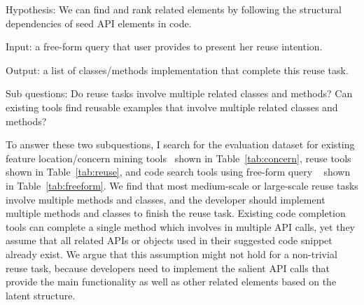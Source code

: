 Hypothesis: We can find and rank related elements by following the structural dependencies of seed API elements in code. 

Input: a free-form query that user provides to present her reuse intention.

Output: a list of classes/methods implementation that complete this reuse task.

Sub questions: Do reuse tasks involve multiple related classes and methods? Can existing tools find reusable examples that involve multiple related classes and methods?



To answer these two subquestions, I search for the evaluation dataset for existing feature location/concern mining tools~\cite{Denys:FCA12, Hill:FindConcept07, Hassan:concernHistory10, Breu:DynamicAspect04} shown in Table~\ref{tab:concern},    reuse tools~\cite{Holmes:reuse07, Holmes:ASE09} shown in Table~\ref{tab:reuse}, and code search tools using free-form query ~\cite{sniff:Sen09, Portfolio:DenysICSE11, Sourcerer:SC14, Gvero:ICSE15, spotWork:ICSE14} shown in Table~\ref{tab:freeform}. We find that most medium-scale or large-scale reuse tasks involve multiple methods and classes,  and the developer should implement multiple methods and classes to finish the reuse task. Existing  code completion tools can complete a single method which involves in multiple API calls, yet they assume that all related APIs or  objects used in their suggested code snippet already exist. We argue that this assumption might not hold for a non-trivial reuse task, because developers need to implement the salient API calls that provide the main functionality as well as other related elements based on the latent structure.  





